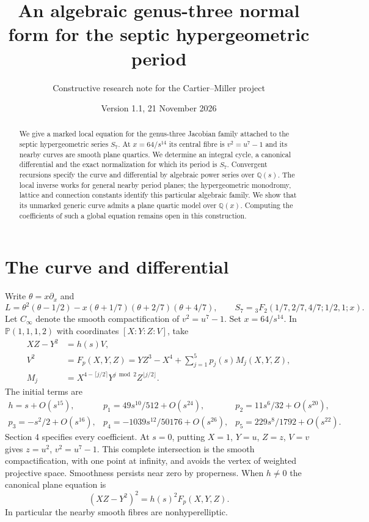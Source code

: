 \documentclass[10pt]{article}
\title{An algebraic genus-three normal form for the septic hypergeometric period}
\author{Constructive research note for the Cartier--Miller project}
\date{Version 1.1, 21 November 2026}
\newcommand{\Q}{\mathbb Q}\newcommand{\C}{\mathbb C}\newcommand{\Z}{\mathbb Z}
\begin{document}
\maketitle
\begin{abstract}
We give a marked local equation for the genus-three Jacobian family attached to the septic hypergeometric series $S_7$. At $x=64/s^{14}$ its central fibre is $v^2=u^7-1$ and its nearby curves are smooth plane quartics. We determine an integral cycle, a canonical differential and the exact normalization for which its period is $S_7$. Convergent recursions specify the curve and differential by algebraic power series over $\Q(s)$. The local inverse works for general nearby period planes; the hypergeometric monodromy, lattice and connection constants identify this particular algebraic family. We show that its unmarked generic curve admits a plane quartic model over $\Q(x)$. Computing the coefficients of such a global equation remains open in this construction.
\end{abstract}

\section{The curve and differential}
Write $\theta=x\partial_x$ and
\[
 L=\theta^2(\theta-1/2)-x(\theta+1/7)(\theta+2/7)(\theta+4/7),
 \qquad S_7={}_3F_2(1/7,2/7,4/7;1/2,1;x).
\]
Let $C_\infty$ denote the smooth compactification of $v^2=u^7-1$. Set $x=64/s^{14}$. In $\mathbb P(1,1,1,2)$ with coordinates $[X:Y:Z:V]$, take
\begin{align}
 XZ-Y^2&=h(s)V,\label{curve1}\\
 V^2&=F_p(X,Y,Z)=YZ^3-X^4+\sum_{j=1}^5p_j(s)M_j(X,Y,Z),\label{curve2}\\
 M_j&=X^{4-\lceil j/2\rceil}Y^{j\bmod2}Z^{\lfloor j/2\rfloor}.\nonumber
\end{align}
The initial terms are
\[
\begin{array}{lll}
 h=s+O(s^{15}),& p_1=49s^{10}/512+O(s^{24}),&
 p_2=11s^6/32+O(s^{20}),\\
 p_3=-s^2/2+O(s^{16}),&p_4=-1039s^{12}/50176+O(s^{26}),&
 p_5=229s^8/1792+O(s^{22}).
\end{array}
\]
Section 4 specifies every coefficient. At $s=0$, putting $X=1$, $Y=u$, $Z=z$, $V=v$ gives $z=u^2$, $v^2=u^7-1$. This complete intersection is the smooth compactification, with one point at infinity, and avoids the vertex of weighted projective space. Smoothness persists near zero by properness. When $h\ne0$ the canonical plane equation is
\[
 (XZ-Y^2)^2=h(s)^2 F_p(X,Y,Z).
\]
In particular the nearby smooth fibres are nonhyperelliptic.
\end{document}
